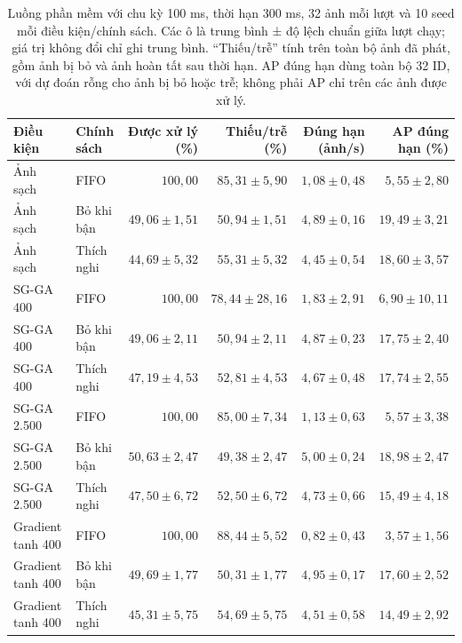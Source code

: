 \documentclass[a4paper,fleqn]{cas-dc}
\begin{document}
\begin{table}[t]
\centering
\small
\caption{Luồng phần mềm với chu kỳ 100 ms, thời hạn 300 ms, 32 ảnh mỗi lượt và 10 seed mỗi điều kiện/chính sách. Các ô là trung bình ± độ lệch chuẩn giữa lượt chạy; giá trị không đổi chỉ ghi trung bình. “Thiếu/trễ” tính trên toàn bộ ảnh đã phát, gồm ảnh bị bỏ và ảnh hoàn tất sau thời hạn. AP đúng hạn dùng toàn bộ 32 ID, với dự đoán rỗng cho ảnh bị bỏ hoặc trễ; không phải AP chỉ trên các ảnh được xử lý.}
\begin{tabularx}{\textwidth}{XXrrrr}
\toprule
Điều kiện & Chính sách & Được xử lý (\%) & Thiếu/trễ (\%) & Đúng hạn (ảnh/s) & AP đúng hạn (\%) \\
\midrule
Ảnh sạch & FIFO & $100{,}00$ & $85{,}31\pm5{,}90$ & $1{,}08\pm0{,}48$ & $5{,}55\pm2{,}80$ \\
Ảnh sạch & Bỏ khi bận & $49{,}06\pm1{,}51$ & $50{,}94\pm1{,}51$ & $4{,}89\pm0{,}16$ & $19{,}49\pm3{,}21$ \\
Ảnh sạch & Thích nghi & $44{,}69\pm5{,}32$ & $55{,}31\pm5{,}32$ & $4{,}45\pm0{,}54$ & $18{,}60\pm3{,}57$ \\
SG-GA 400 & FIFO & $100{,}00$ & $78{,}44\pm28{,}16$ & $1{,}83\pm2{,}91$ & $6{,}90\pm10{,}11$ \\
SG-GA 400 & Bỏ khi bận & $49{,}06\pm2{,}11$ & $50{,}94\pm2{,}11$ & $4{,}87\pm0{,}23$ & $17{,}75\pm2{,}40$ \\
SG-GA 400 & Thích nghi & $47{,}19\pm4{,}53$ & $52{,}81\pm4{,}53$ & $4{,}67\pm0{,}48$ & $17{,}74\pm2{,}55$ \\
SG-GA 2.500 & FIFO & $100{,}00$ & $85{,}00\pm7{,}34$ & $1{,}13\pm0{,}63$ & $5{,}57\pm3{,}38$ \\
SG-GA 2.500 & Bỏ khi bận & $50{,}63\pm2{,}47$ & $49{,}38\pm2{,}47$ & $5{,}00\pm0{,}24$ & $18{,}98\pm2{,}47$ \\
SG-GA 2.500 & Thích nghi & $47{,}50\pm6{,}72$ & $52{,}50\pm6{,}72$ & $4{,}73\pm0{,}66$ & $15{,}49\pm4{,}18$ \\
Gradient tanh 400 & FIFO & $100{,}00$ & $88{,}44\pm5{,}52$ & $0{,}82\pm0{,}43$ & $3{,}57\pm1{,}56$ \\
Gradient tanh 400 & Bỏ khi bận & $49{,}69\pm1{,}77$ & $50{,}31\pm1{,}77$ & $4{,}95\pm0{,}17$ & $17{,}60\pm2{,}52$ \\
Gradient tanh 400 & Thích nghi & $45{,}31\pm5{,}75$ & $54{,}69\pm5{,}75$ & $4{,}51\pm0{,}58$ & $14{,}49\pm2{,}92$ \\
\bottomrule
\end{tabularx}
\label{tab:extended_stream_100}
\end{table}
\end{document}
